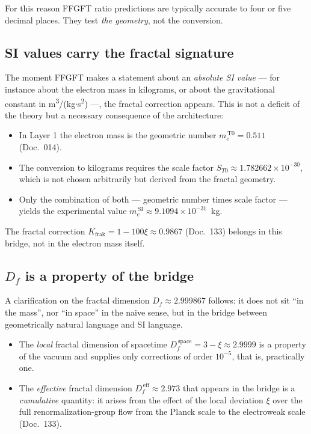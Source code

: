 For this reason FFGFT ratio predictions are typically accurate to
four or five decimal places. They test \emph{the geometry}, not the
conversion.

\subsection{SI values carry the fractal signature}

The moment FFGFT makes a statement about an \emph{absolute SI value}
--- for instance about the electron mass in kilograms, or about the
gravitational constant in m\textsuperscript{3}/(kg$\cdot$s\textsuperscript{2})
---, the fractal correction appears. This is not a deficit of the
theory but a necessary consequence of the architecture:

\begin{itemize}\setlength\itemsep{0pt}
  \item In Layer 1 the electron mass is the geometric number
        $m_{e}^{\,\mathrm{T0}} = 0{.}511$ (Doc.~014).
  \item The conversion to kilograms requires the scale factor
        $S_{T0} \approx 1{.}782662\times 10^{-30}$, which is not chosen
        arbitrarily but derived from the fractal geometry.
  \item Only the combination of both --- geometric number times scale
        factor --- yields the experimental value
        $m_{e}^{\,\mathrm{SI}} \approx 9{.}1094 \times 10^{-31}$~kg.
\end{itemize}

The fractal correction $K_{\mathrm{frak}} = 1 - 100\xi \approx 0{.}9867$
(Doc.~133) belongs in this bridge, not in the electron mass itself.

\subsection{$D_f$ is a property of the bridge}

A clarification on the fractal dimension $D_{f} \approx 2{.}999867$
follows: it does not sit ``in the mass'', nor ``in space'' in the
naive sense, but in the bridge between geometrically natural
language and SI language.

\begin{itemize}\setlength\itemsep{0pt}
  \item The \emph{local} fractal dimension of spacetime
        $D_{f}^{\,\text{space}} = 3 - \xi \approx 2{.}9999$ is a
        property of the vacuum and supplies only corrections of order
        $10^{-5}$, that is, practically one.
  \item The \emph{effective} fractal dimension
        $D_{f}^{\,\text{eff}} \approx 2{.}973$ that appears in the
        bridge is a \emph{cumulative} quantity: it arises from the
        effect of the local deviation $\xi$ over the full
        renormalization-group flow from the Planck scale to the
        electroweak scale (Doc.~133).
\end{itemize}

